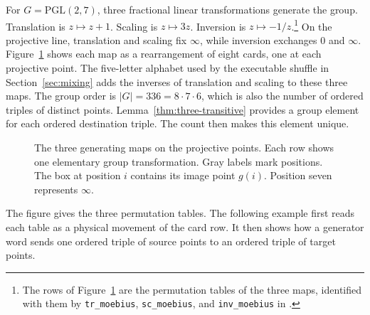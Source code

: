 \documentclass[runningheads]{llncs}
\newcommand{\coqin}[1]{\texttt{#1}}
\newcommand{\PG}{\mathrm{PGL}(2,7)}
\begin{document}
For $G=\PG$, three fractional linear transformations generate the group.
Translation is $z\mapsto z+1$. Scaling is $z\mapsto 3z$. Inversion is
$z\mapsto -1/z$.\footnote{The rows of Figure~\ref{fig:pgl-generators} are
the permutation tables of the three maps, identified with them by
\coqin{tr\_moebius}, \coqin{sc\_moebius}, and \coqin{inv\_moebius} in
.}
 On the projective line, translation and scaling fix
$\infty$, while inversion exchanges $0$ and $\infty$.
Figure~\ref{fig:pgl-generators} shows each map as a rearrangement of eight
cards, one at each projective point. The five-letter alphabet used by the
executable shuffle in Section~\ref{sec:mixing} adds the inverses of
translation and scaling to these three maps. The group order is
$|G|=336=8\cdot7\cdot6$, which is also the number of ordered triples of
distinct points. Lemma~\ref{thm:three-transitive} provides a group element for
each ordered destination triple. The count then makes this element unique.

\begin{figure}[t]
  \centering
  \caption{The three generating maps on the projective points. Each row shows one
elementary group transformation. Gray labels mark positions. The box at
position $i$ contains its image point $g(i)$. Position seven represents
$\infty$.}
  \label{fig:pgl-generators}
\end{figure}

The figure gives the three permutation tables. The following example first
reads each table as a physical movement of the card row. It then shows how a
generator word sends one ordered triple of source points to an ordered triple
of target points.
\end{document}
